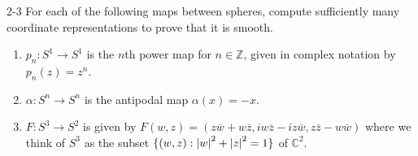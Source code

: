 \begin{customprob}{2-3}\label{problem_2_3}
  For each of the following maps between spheres, compute sufficiently many coordinate representations to prove that it is smooth.

  \begin{enumerate}[label=(\alph*)]
    \item 
      $p_n: S^1 \rightarrow S^1$ is the $n$th power map for $n \in \mathbb{Z}$, given in complex notation by $p_n(z) = z^n$.
    \item
      $\alpha: S^n \rightarrow S^n$ is the antipodal map $\alpha(x) = -x$.
    \item
      $F: S^3 \rightarrow S^2$ is given by $F(w, z) = (z\overline{w} + w\overline{z}, iw\overline{z} - iz\overline{w}, z\overline{z} - w\overline{w})$ where we think of $S^3$ as the subset $\{ (w, z) : \abs{w}^2 + \abs{z}^2 = 1 \}$ of $\mathbb{C}^2$.
  \end{enumerate}
\end{customprob}

